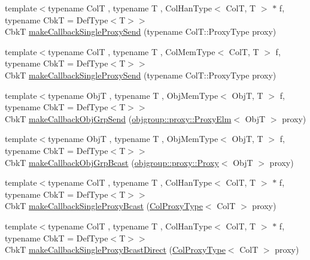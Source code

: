 \begin{DoxyCompactItemize}
\item 
{\footnotesize template$<$typename ColT , typename T , Col\+Han\+Type$<$ Col\+T, T $>$ $\ast$ f, typename CbkT  = Def\+Type$<$\+T$>$$>$ }\\CbkT \hyperlink{structvt_1_1pipe_1_1_pipe_manager_t_l_a2c8c3a5aca22b2526fe68dd543a8a888}{make\+Callback\+Single\+Proxy\+Send} (typename Col\+T\+::\+Proxy\+Type proxy)
\item 
{\footnotesize template$<$typename ColT , typename T , Col\+Mem\+Type$<$ Col\+T, T $>$ f, typename CbkT  = Def\+Type$<$\+T$>$$>$ }\\CbkT \hyperlink{structvt_1_1pipe_1_1_pipe_manager_t_l_a2c8c3a5aca22b2526fe68dd543a8a888}{make\+Callback\+Single\+Proxy\+Send} (typename Col\+T\+::\+Proxy\+Type proxy)
\item 
{\footnotesize template$<$typename ObjT , typename T , Obj\+Mem\+Type$<$ Obj\+T, T $>$ f, typename CbkT  = Def\+Type$<$\+T$>$$>$ }\\CbkT \hyperlink{structvt_1_1pipe_1_1_pipe_manager_t_l_a98f92fd3f75e48766b55c7b7253c19b4}{make\+Callback\+Obj\+Grp\+Send} (\hyperlink{structvt_1_1objgroup_1_1proxy_1_1_proxy_elm}{objgroup\+::proxy\+::\+Proxy\+Elm}$<$ ObjT $>$ proxy)
\item 
{\footnotesize template$<$typename ObjT , typename T , Obj\+Mem\+Type$<$ Obj\+T, T $>$ f, typename CbkT  = Def\+Type$<$\+T$>$$>$ }\\CbkT \hyperlink{structvt_1_1pipe_1_1_pipe_manager_t_l_a8a4da1e38acd018f847aa9fddae44956}{make\+Callback\+Obj\+Grp\+Bcast} (\hyperlink{structvt_1_1objgroup_1_1proxy_1_1_proxy}{objgroup\+::proxy\+::\+Proxy}$<$ ObjT $>$ proxy)
\item 
{\footnotesize template$<$typename ColT , typename T , Col\+Han\+Type$<$ Col\+T, T $>$ $\ast$ f, typename CbkT  = Def\+Type$<$\+T$>$$>$ }\\CbkT \hyperlink{structvt_1_1pipe_1_1_pipe_manager_t_l_a0f66ce82b544151cbdec67a13a6ead34}{make\+Callback\+Single\+Proxy\+Bcast} (\hyperlink{structvt_1_1pipe_1_1_pipe_manager_t_l_af56c58cad882496e35f01227d4da3898}{Col\+Proxy\+Type}$<$ ColT $>$ proxy)
\item 
{\footnotesize template$<$typename ColT , typename T , Col\+Han\+Type$<$ Col\+T, T $>$ $\ast$ f, typename CbkT  = Def\+Type$<$\+T$>$$>$ }\\CbkT \hyperlink{structvt_1_1pipe_1_1_pipe_manager_t_l_aff70024da9ee15ef2c935ca21d18a80d}{make\+Callback\+Single\+Proxy\+Bcast\+Direct} (\hyperlink{structvt_1_1pipe_1_1_pipe_manager_t_l_af56c58cad882496e35f01227d4da3898}{Col\+Proxy\+Type}$<$ ColT $>$ proxy)

\end{DoxyCompactItemize}
